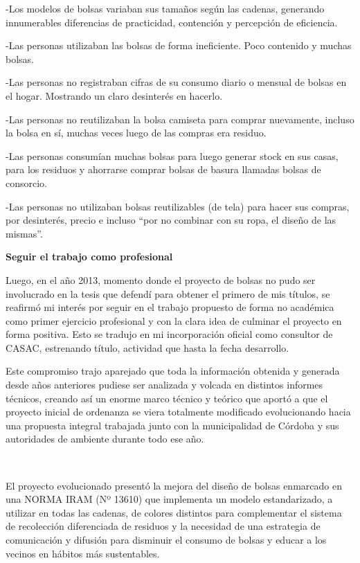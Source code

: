 \begin{fullwidth}
-Los modelos de bolsas variaban sus tamaños según las cadenas, generando
innumerables diferencias de practicidad, contención y percepción de
eficiencia.

-Las personas utilizaban las bolsas de forma ineficiente. Poco contenido
y muchas bolsas.

-Las personas no registraban cifras de su consumo diario o mensual de
bolsas en el hogar. Mostrando un claro desinterés en hacerlo.

-Las personas no reutilizaban la bolsa camiseta para comprar nuevamente,
incluso la bolsa en sí, muchas veces luego de las compras era residuo.

-Las personas consumían muchas bolsas para luego generar stock en sus
casas, para los residuos y ahorrarse comprar bolsas de basura llamadas
bolsas de consorcio.

-Las personas no utilizaban bolsas reutilizables (de tela) para hacer
sus compras, por desinterés, precio e incluso ``por no combinar con su
ropa, el diseño de las mismas''.

\textbf{Seguir el trabajo como profesional}

Luego, en el año 2013, momento donde el proyecto de bolsas no pudo ser
involucrado en la tesis que defendí para obtener el primero de mis
títulos, se reafirmó mi interés por seguir en el trabajo propuesto de
forma no académica como primer ejercicio profesional y con la clara idea
de culminar el proyecto en forma positiva. Esto se tradujo en mi
incorporación oficial como consultor de CASAC, estrenando título,
actividad que hasta la fecha desarrollo.

Este compromiso trajo aparejado que toda la información obtenida y
generada desde años anteriores pudiese ser analizada y volcada en
distintos informes técnicos, creando así un enorme marco técnico y
teórico que aportó a que el proyecto inicial de ordenanza se viera
totalmente modificado evolucionando hacia una propuesta integral
trabajada junto con la municipalidad de Córdoba y sus autoridades de
ambiente durante todo ese año.

~

El proyecto evolucionado presentó la mejora del diseño de bolsas
enmarcado en una NORMA IRAM (Nº 13610) que implementa un modelo
estandarizado, a utilizar en todas las cadenas, de colores distintos
para complementar el sistema de recolección diferenciada de residuos y
la necesidad de una estrategia de comunicación y difusión para disminuir
el consumo de bolsas y educar a los vecinos en hábitos más sustentables.


\end{fullwidth}
